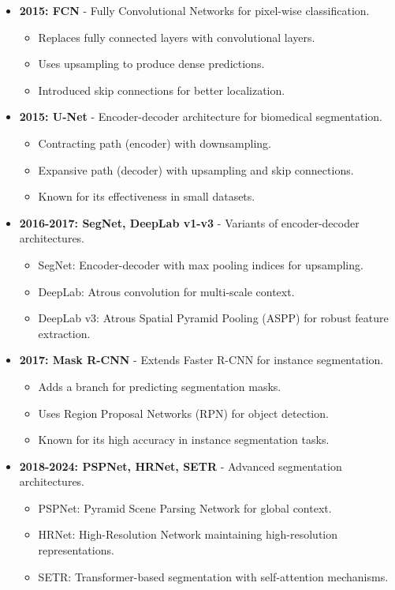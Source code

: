 \documentclass{article}
\begin{document}
\begin{itemize}[leftmargin=1.5em]
  \item \textbf{2015: FCN} 
    - Fully Convolutional Networks for pixel-wise classification.
        \begin{itemize}
            \item Replaces fully connected layers with convolutional layers.
            \item Uses upsampling to produce dense predictions.
            \item Introduced skip connections for better localization.
        \end{itemize}
  \item \textbf{2015: U-Net} 
    - Encoder-decoder architecture for biomedical segmentation.
        \begin{itemize}
            \item  Contracting path (encoder) with downsampling.
            \item  Expansive path (decoder) with upsampling and skip connections.
            \item  Known for its effectiveness in small datasets.
        \end{itemize}
  \item \textbf{2016-2017: SegNet, DeepLab v1-v3}   
    - Variants of encoder-decoder architectures.
        \begin{itemize}
            \item SegNet: Encoder-decoder with max pooling indices for upsampling.
            \item DeepLab: Atrous convolution for multi-scale context.
            \item DeepLab v3: Atrous Spatial Pyramid Pooling (ASPP) for robust feature extraction.
        \end{itemize}
  \item \textbf{2017: Mask R-CNN} 
    - Extends Faster R-CNN for instance segmentation.
        \begin{itemize}
            \item Adds a branch for predicting segmentation masks.
            \item Uses Region Proposal Networks (RPN) for object detection.
            \item Known for its high accuracy in instance segmentation tasks.
        \end{itemize}

  \item \textbf{2018-2024: PSPNet, HRNet, SETR}
    - Advanced segmentation architectures.
        \begin{itemize}
            \item PSPNet: Pyramid Scene Parsing Network for global context.
            \item HRNet: High-Resolution Network maintaining high-resolution representations.
            \item SETR: Transformer-based segmentation with self-attention mechanisms.
        \end{itemize}
\end{itemize}
\end{document}
